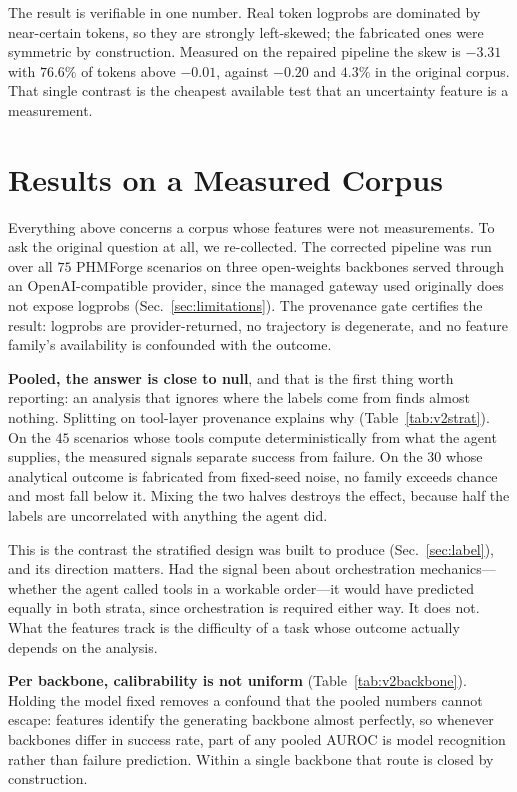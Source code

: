 \documentclass[conference]{IEEEtran}
\begin{document}
The result is verifiable in one number. Real token logprobs are dominated by
near-certain tokens, so they are strongly left-skewed; the fabricated ones were
symmetric by construction. Measured on the repaired pipeline the skew is
$-3.31$ with $76.6\%$ of tokens above $-0.01$, against $-0.20$ and $4.3\%$ in the
original corpus. That single contrast is the cheapest available test that an
uncertainty feature is a measurement.

\section{Results on a Measured Corpus}
\label{sec:v2results}

Everything above concerns a corpus whose features were not measurements. To ask
the original question at all, we re-collected. The corrected pipeline was run
over all $75$ PHMForge scenarios on three open-weights backbones served through
an OpenAI-compatible provider, since the managed gateway used originally does not
expose logprobs (Sec.~\ref{sec:limitations}). The provenance gate certifies the
result: logprobs are provider-returned, no trajectory is degenerate, and no
feature family's availability is confounded with the outcome.



\textbf{Pooled, the answer is close to null}, and that is the first thing worth
reporting: an analysis that ignores where the labels come from finds almost
nothing. Splitting on tool-layer provenance explains why
(Table~\ref{tab:v2strat}). On the $45$ scenarios whose tools compute
deterministically from what the agent supplies, the measured signals separate
success from failure. On the $30$ whose analytical outcome is fabricated from
fixed-seed noise, no family exceeds chance and most fall below it. Mixing the two
halves destroys the effect, because half the labels are uncorrelated with
anything the agent did.

This is the contrast the stratified design was built to produce
(Sec.~\ref{sec:label}), and its direction matters. Had the signal been about
orchestration mechanics---whether the agent called tools in a workable
order---it would have predicted equally in both strata, since orchestration is
required either way. It does not. What the features track is the difficulty of a
task whose outcome actually depends on the analysis.



\textbf{Per backbone, calibrability is not uniform}
(Table~\ref{tab:v2backbone}). Holding the model fixed removes a confound that
the pooled numbers cannot escape: features identify the generating backbone
almost perfectly, so whenever backbones differ in success rate, part of any
pooled AUROC is model recognition rather than failure prediction. Within a single
backbone that route is closed by construction.
\end{document}
